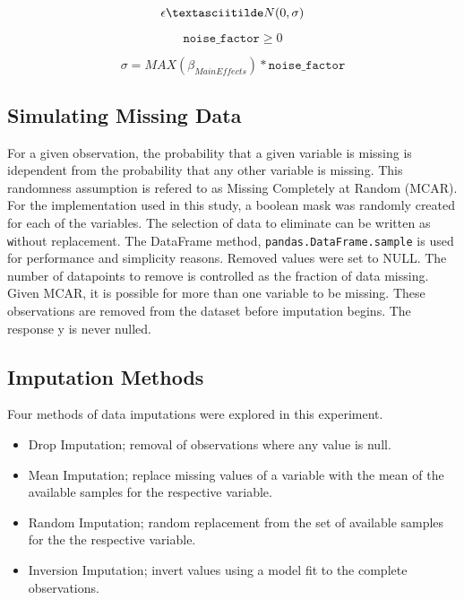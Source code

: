 \documentclass[../paper.tex]{subfiles}
\begin{document}
\begin{equation}\label{eq:epsilon_def}
  \epsilon \textasciitilde N(0, \sigma)
\end{equation}

\begin{equation}\label{eq:noise_factor_def}
  \texttt{noise_factor} \geq 0
\end{equation}

\begin{equation}\label{eq:noise_factor_sigma_def}
  \sigma = MAX(\beta_{Main Effects}) * \texttt{noise_factor}
\end{equation}




\subsection{Simulating Missing Data}
For a given observation, the probability that a given variable is missing is
idependent from the probability that any other variable is missing. This randomness
assumption is refered to as Missing Completely at Random (MCAR). For the implementation
used in this study, a boolean mask was randomly created for each
of the variables. The selection of data to eliminate can be written as
\texttt without replacement.
The DataFrame method, \texttt{pandas.DataFrame.sample} is used for
performance and simplicity reasons. Removed values were set to NULL. The number of
datapoints to remove is controlled as the fraction of data missing. Given MCAR,
it is possible for more than one variable to be missing. These observations are
removed from the dataset before imputation begins. The response y is never
nulled.


\subsection{Imputation Methods}
Four methods of data imputations were explored in this experiment.

\begin{itemize}
  \item Drop Imputation; removal of observations where any value is null.
  \item Mean Imputation; replace missing values of a variable with the mean of
  the available samples for the respective variable.
  \item Random Imputation; random replacement from the set of available samples
  for the the respective variable.
  \item Inversion Imputation; invert values using a model fit to the complete observations.
\end{itemize}
\end{document}
